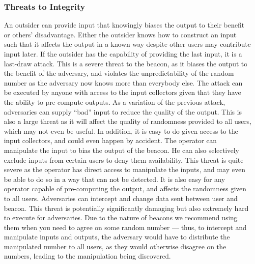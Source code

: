 \subsubsection{Threats to Integrity}

 An outsider can provide input that knowingly biases the output to their benefit or others' disadvantage. Either the outsider knows how to construct an input such that it affects the output in a known way despite other users may contribute input later. If the outsider has the capability of providing the last input, it is a last-draw attack. This is a severe threat to the beacon, as it biases the output to the benefit of the adversary, and violates the unpredictability of the random number as the adversary now knows more than everybody else. The attack can be executed by anyone with access to the input collectors given that they have the ability to pre-compute outputs.
 As a variation of the previous attack, adversaries can supply \enquote{bad} input to reduce the quality of the output. This is also a large threat as it will affect the quality of randomness provided to all users, which may not even be useful. In addition, it is easy to do given access to the input collectors, and could even happen by accident.
 The operator can manipulate the input to bias the output of the beacon. He can also selectively exclude inputs from certain users to deny them availability. This threat is quite severe as the operator has direct access to manipulate the inputs, and may even be able to do so in a way that can not be detected. It is also easy for any operator capable of pre-computing the output, and affects the randomness given to all users.
 Adversaries can intercept and change data sent between user and beacon. This threat is potentially significantly damaging but also extremely hard to execute for adversaries. Due to the nature of beacons we recommend using them when you need to agree on some random number --- thus, to intercept and manipulate inputs and outputs, the adversary would have to distribute the manipulated number to all users, as they would otherwise disagree on the numbers, leading to the manipulation being discovered.
